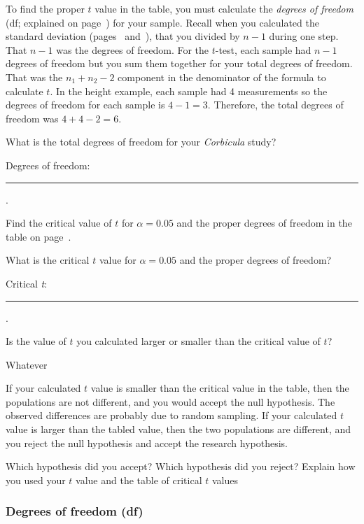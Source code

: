 \documentclass[12pt]{exam}
\newcommand*\AnswerBox[2]{%
    \parbox[t][#1]{0.92\textwidth}{%
    \begin{solution}#2\end{solution}}
}
\newcommand*\Corbicula{\textit{Corbicula}}
\newcommand*\AnswerBlank{\rule{0.75in}{0.4pt}\kern0.67pt.}
\begin{document}
\begin{questions}
To find the proper $t$ value in the table, you must calculate the \emph{degrees of freedom} (df; explained on page~\pageref{degrees_freedom}) for your sample. Recall  when you calculated the standard deviation (pages~\pageref{tab:height_sd} and~\pageref{tab:sdA}), that you divided by $n-1$ during one step. That $n-1$ was the degrees of freedom. For the $t$-test, each sample had $n-1$ degrees of freedom but you sum them together for your total degrees of freedom. That was the $n_1 + n_2 -2$ component in the denominator of the formula to calculate $t$. In the height example, each sample had 4 measurements so the degrees of freedom for each sample is $4-1 = 3$. Therefore, the total degrees of freedom was $4 + 4 - 2 = 6$.

\question
What is the total degrees of freedom for your \Corbicula{} study? \bigskip

Degrees of freedom:  \AnswerBlank{}

\bigskip

Find the critical value of $t$ for $\alpha = 0.05$ and the proper degrees of  freedom in the table on page~\pageref{tab:ttable}. 

\question 
What is the critical $t$ value for $\alpha = 0.05$ and the proper degrees of freedom?  \bigskip

Critical \textit{t}: \AnswerBlank{}

\bigskip

\question
Is the value of $t$ you calculated larger or smaller than the critical value of $t$?

\AnswerBox{2\baselineskip}{Whatever}

If your calculated $t$ value is smaller than the critical value in the table, then the populations are not different, and you would accept the null hypothesis. The observed differences are probably due to random sampling. If your calculated $t$ value is larger than the tabled value, then the two populations are different, and you reject the null hypothesis and accept the research hypothesis.

\question
Which hypothesis did you accept? Which hypothesis did you reject? Explain how you used your $t$ value and the table of critical $t$ values 






\end{questions}


\newpage

\subsubsection*{Degrees of freedom (df)}\label{degrees_freedom}
\end{document}
